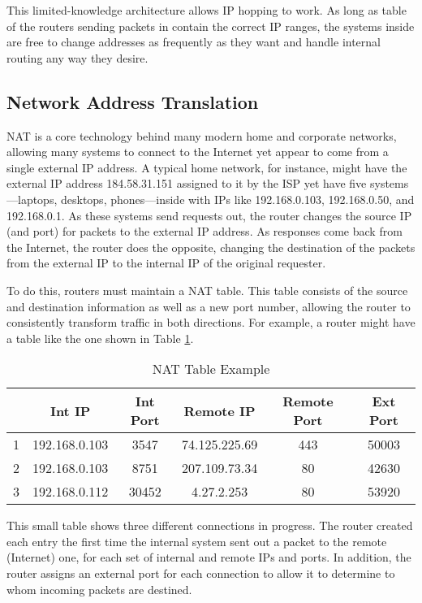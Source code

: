 \par This limited-knowledge architecture allows IP hopping to work. As long as table of the routers sending packets in contain the correct \ac{IP} ranges, the systems inside are free to change addresses as frequently as they want and handle internal routing any way they desire.

\subsection{Network Address Translation}
\label{sec:nat}
\par \ac{NAT} is a core technology behind many modern home and corporate networks, allowing many systems to connect to the Internet yet appear to come from a single external \ac{IP} address. A typical home network, for instance, might have the external IP address 184.58.31.151 assigned to it by the \ac{ISP} yet have five systems---laptops, desktops, phones---inside with \acp{IP} like 192.168.0.103, 192.168.0.50, and 192.168.0.1. As these systems send requests out, the router changes the source IP (and port) for packets to the external IP address. As responses come back from the Internet, the router does the opposite, changing the destination of the packets from the external IP to the internal IP of the original requester.

\par To do this, routers must maintain a \ac{NAT} table. This table consists of the source and destination information as well as a new port number, allowing the router to consistently transform traffic in both directions. For example, a router might have a table like the one shown in Table \ref{tab:nat_example}.

\begin{table}
\caption{NAT Table Example}
\label{tab:nat_example}
\centering
\begin{tabular}{r|ccccc}
  & Int IP & Int Port & Remote IP & Remote Port & Ext Port\\
\hline
1 & 192.168.0.103 & 3547 & 74.125.225.69 & 443 & 50003\\
2 & 192.168.0.103 & 8751 & 207.109.73.34 & 80 & 42630\\
3 & 192.168.0.112 & 30452 & 4.27.2.253 & 80 & 53920
\end{tabular}
\end{table}

\par This small table shows three different connections in progress. The router created each entry the first time the internal system sent out a packet to the remote (Internet) one, for each set of internal and remote IPs and ports. In addition, the router assigns an external port for each connection to allow it to determine to whom incoming packets are destined.

